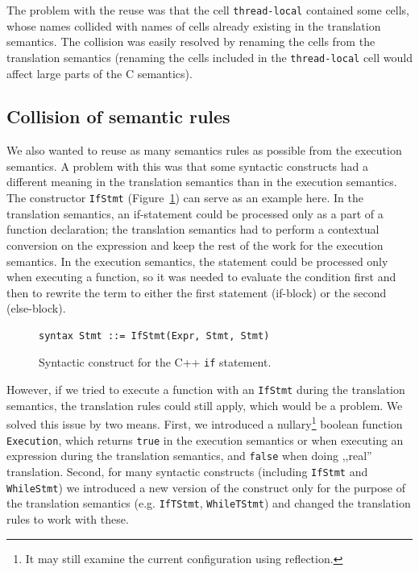 \documentclass[nolot,nolof,nocover,printed]{fithesis3}
\begin{document}
The problem with the reuse was that the cell \texttt{thread-local} contained some cells, whose names collided with names of cells already existing in the translation semantics. The collision was easily resolved by renaming the cells from the translation semantics (renaming the cells included in the \texttt{thread-local} cell would affect large parts of the C semantics).

\subsection{Collision of semantic rules}

We also wanted to reuse as many semantics rules as possible from the execution semantics. A problem with this was that some syntactic constructs had a different meaning in the translation semantics than in the execution semantics. The constructor \texttt{IfStmt} (Figure~\ref{fig:ifStmt}) can serve as an example here. In the translation semantics, an if-statement could be processed only as a part of a function declaration; the translation semantics had to perform a contextual conversion on the expression and keep the rest of the work for the execution semantics. In the execution semantics, the statement could be processed only when executing a function, so it was needed to evaluate the condition first and then to rewrite the term to either the first statement (if-block) or the second (else-block).

\begin{figure}[ht]
\begin{lstlisting}
syntax Stmt ::= IfStmt(Expr, Stmt, Stmt)
\end{lstlisting}
\caption{Syntactic construct for the C++ \texttt{if} statement.}
\label{fig:ifStmt}
\end{figure}

However, if we tried to execute a function with an \texttt{IfStmt} during the translation semantics, the translation rules could still apply, which would be a problem. We solved this issue by two means. First, we introduced a nullary\footnote{It may still examine the current configuration using reflection.} boolean function \texttt{Execution}, which returns \texttt{true} in the execution semantics or when executing an expression during the translation semantics, and \texttt{false} when doing ,,real'' translation. Second, for many syntactic constructs (including \texttt{IfStmt} and \texttt{WhileStmt}) we introduced a new version of the construct only for the purpose of the translation semantics (e.g. \texttt{IfTStmt}, \texttt{WhileTStmt}) and changed the translation rules to work with these.
\end{document}
